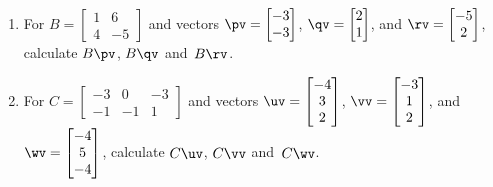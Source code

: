 \begin{exercise}
\begin{enumerate}
\item For \(B=\begin{bmatrix} 1&6
\\4&-5 \end{bmatrix}\) and vectors 
\(\pv=\begin{bmatrix} -3\\-3 \end{bmatrix}\), 
\(\qv=\begin{bmatrix} 2\\1 \end{bmatrix}\), and
\(\rv=\begin{bmatrix} -5\\2 \end{bmatrix}\), 
calculate  \(B\pv\), \(B\qv\) and~\(B\rv\).


\item For \(C=\begin{bmatrix} -3&0&-3
\\-1&-1&1 \end{bmatrix}\) and vectors 
\(\uv=\begin{bmatrix} -4\\3\\2 \end{bmatrix}\), 
\(\vv=\begin{bmatrix} -3\\1\\2 \end{bmatrix}\), and
\(\wv=\begin{bmatrix} -4\\5\\-4 \end{bmatrix}\), 
calculate  \(C\uv\), \(C\vv\) and~\(C\wv\).



\end{enumerate}
\end{exercise}

